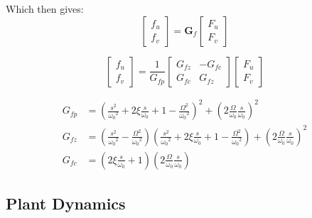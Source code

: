 \documentclass{ISMA_USD2020}
\begin{document}
Which then gives:
\begin{equation}
\begin{bmatrix} f_{u} \\ f_{v} \end{bmatrix} =
\bm{G}_{f}
\begin{bmatrix} F_u \\ F_v \end{bmatrix}
\end{equation}

\begin{equation}
\begin{bmatrix} f_{u} \\ f_{v} \end{bmatrix} =
\frac{1}{G_{fp}}
\begin{bmatrix}
  G_{fz} & -G_{fc} \\
  G_{fc} &  G_{fz}
\end{bmatrix}
\begin{bmatrix} F_u \\ F_v \end{bmatrix}
\end{equation}

\begin{align}
  G_{fp} &= \left( \frac{s^2}{{\omega_0}^2} + 2 \xi \frac{s}{\omega_0} + 1 - \frac{{\Omega}^2}{{\omega_0}^2} \right)^2 + \left( 2 \frac{\Omega}{\omega_0} \frac{s}{\omega_0} \right)^2 \\
  G_{fz} &= \left( \frac{s^2}{{\omega_0}^2} - \frac{\Omega^2}{{\omega_0}^2} \right) \left( \frac{s^2}{{\omega_0}^2} + 2 \xi \frac{s}{\omega_0} + 1 - \frac{{\Omega}^2}{{\omega_0}^2} \right) + \left( 2 \frac{\Omega}{\omega_0} \frac{s}{\omega_0} \right)^2 \\
  G_{fc} &= \left( 2 \xi \frac{s}{\omega_0} + 1 \right) \left( 2 \frac{\Omega}{\omega_0} \frac{s}{\omega_0} \right)
\end{align}


\subsection{Plant Dynamics}
\label{sec:orgec8431d}
\end{document}
